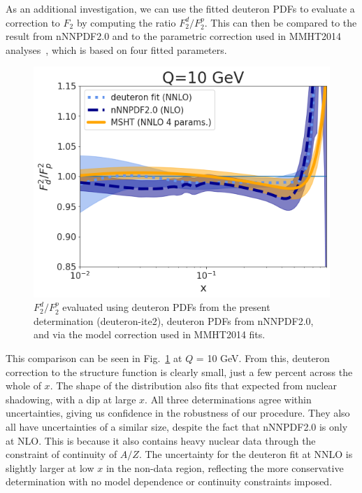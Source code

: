 As an additional investigation, we can use the fitted deuteron PDFs to evaluate a correction to $F_2$ by computing the ratio $F_2^d/F_2^p$. This can then be compared to the result from nNNPDF2.0 and to the parametric correction used in MMHT2014 analyses~\cite{Harland-Lang:2014zoa}, which is based on four fitted parameters. 
\begin{figure}[H]
  \begin{center}
      \includegraphics[width=0.8\linewidth]{nuclear/plots/corrfac_new.png}
    \caption{$F_2^d/F_2^p$ evaluated using deuteron PDFs from the present determination (deuteron-ite2), deuteron PDFs from nNNPDF2.0, and via the model correction used in MMHT2014 fits.
    \label{fig:deutpdfcomp} }
    \end{center}
\end{figure}   
This comparison can be seen in Fig.~\ref{fig:deutpdfcomp} at $Q$ = 10 GeV. From this, deuteron correction to the structure function is clearly small, just a few percent across the whole of $x$. The shape of the distribution also fits that expected from nuclear shadowing, with a dip at large $x$. All three determinations agree within uncertainties, giving us confidence in the robustness of our procedure. They also all have uncertainties of a similar size, despite the fact that nNNPDF2.0 is only at NLO. This is because it also contains heavy nuclear data through the constraint of continuity of $A/Z$. The uncertainty for the deuteron fit at NNLO is slightly larger at low $x$ in the non-data region, reflecting the more conservative determination with no model dependence or continuity constraints imposed. 

